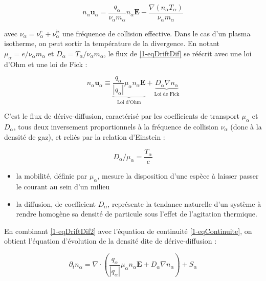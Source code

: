 \begin{refsection}
\begin{equation}
\label{1-eqDriftDif}
n_\alpha\mathbf u_\alpha=\frac{q_\alpha}{\nu_\alpha m_\alpha}n_\alpha\mathbf
E-\frac{\nabla\left(n_\alpha T_\alpha\right)}{\nu_\alpha
m_\alpha}
\end{equation}

avec $\nu_\alpha=\nu_\alpha^c+\nu_\alpha^\text{iz}$ une fréquence de collision
effective. Dans le cas d'un plasma isotherme, on peut sortir la température de
la divergence.
En notant $\mu_\alpha=e/\nu_\alpha m_\alpha$ et
$D_\alpha=T_\alpha/\nu_\alpha m_\alpha$, le flux de \eqref{1-eqDriftDif} se
réécrit avec une loi d'Ohm et une loi de Fick :

\begin{equation}
\label{1-eqDriftDif2}
n_\alpha\mathbf u_\alpha\equiv\underbrace{\frac{q_\alpha}{|q_\alpha|}\mu_\alpha n_\alpha\mathbf E}_\text{Loi d'Ohm}+\underbrace{D_\alpha{\nabla n_\alpha}}_\text{Loi
de Fick}
\end{equation}

 C'est le flux de dérive-diffusion, caractérisé par les coefficients de
transport $\mu_\alpha$ et
$D_\alpha$, tous deux inversement proportionnels à la fréquence de collision
$\nu_\alpha$ (donc à la densité de gaz), et reliés par la relation d'Einstein :

\begin{equation}
\label{1-EinsteinRelation}
D_\alpha/\mu_\alpha=\frac{T_\alpha}{e}
\end{equation}

\begin{itemize}
  \item la mobilité, définie par $\mu_\alpha$,
  mesure la disposition d'une espèce à laisser passer le courant au sein d'un milieu
  \item la diffusion, de coefficient $D_\alpha$,
  représente la tendance naturelle d'un système à rendre homogène sa densité de particule sous l'effet
  de l'agitation thermique.
\end{itemize}

En combinant \eqref{1-eqDriftDif2} avec l'équation de continuité
\eqref{1-eqContinuite}, on obtient l'équation d'évolution de la densité
dite de dérive-diffusion :
 
\begin{equation}
\label{1-eqDriftDifContinuite}
\partial_t
n_\alpha=\nabla\cdot({\frac{q_\alpha}{|q_\alpha|}\mu_\alpha n_\alpha\mathbf E}
+{D_\alpha{\nabla n_\alpha}})+S_\alpha
\end{equation}


\end{refsection}
